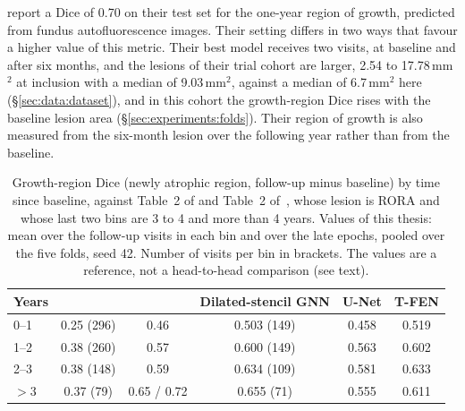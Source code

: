 \citet{Salvi2025} report a Dice of 0.70 on their test set for the one-year region of growth, predicted from fundus
autofluorescence images. Their setting differs in two ways that favour a
higher value of this metric. Their best model receives two visits, at
baseline and after six months, and the lesions of their trial cohort are
larger, 2.54 to 17.78\,mm$^2$ at inclusion with a median of 9.03\,mm$^2$,
against a median of 6.7\,mm$^2$ here (\S\ref{sec:data:dataset}), and in
this cohort the growth-region Dice rises with the baseline lesion area
(\S\ref{sec:experiments:folds}). Their
region of growth is also measured from the six-month lesion over the
following year rather than from the baseline.

\begin{table}[t]
  \centering
  \caption[Growth-region Dice by horizon against prior work.]{%
    Growth-region Dice (newly atrophic region, follow-up minus baseline) by
    time since baseline, against Table~2 of \citet{Mai2024} and Table~2
    of~\citet{Gigon2021}, whose lesion is RORA and whose last two bins are
    3 to 4 and more than 4 years. Values of this thesis: mean over the
    follow-up visits in each bin and over the late epochs, pooled over the
    five folds, seed 42. Number of visits per bin in brackets. The values
    are a reference, not a head-to-head comparison (see text).}
  \label{tab:experiments:mai-bins}
  \footnotesize
  \setlength{\tabcolsep}{4pt}
  \begin{tabular}{l c c c c c}
    \toprule
    Years & \citet{Mai2024} & \citet{Gigon2021} & Dilated-stencil GNN
      & U-Net & T-FEN \\
    \midrule
    0--1      & 0.25 (296) & 0.46 & 0.503 (149) & 0.458 & 0.519 \\
    1--2      & 0.38 (260) & 0.57 & 0.600 (149) & 0.563 & 0.602 \\
    2--3      & 0.38 (148) & 0.59 & 0.634 (109) & 0.581 & 0.633 \\
    $>3$      & 0.37 (79)  & 0.65 / 0.72 & 0.655 (71)  & 0.555 & 0.611 \\
    \bottomrule
  \end{tabular}
\end{table}

